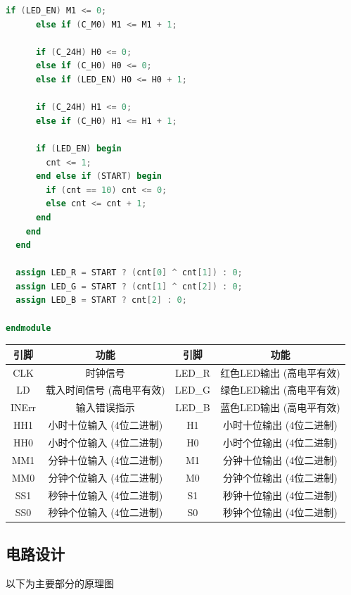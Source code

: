 \documentclass[12pt, a4paper]{ctexart}
\begin{document}
\begin{lstlisting}[language=Verilog, caption={数字时钟模块}]
      if (LED_EN) M1 <= 0;
      else if (C_M0) M1 <= M1 + 1;

      if (C_24H) H0 <= 0;
      else if (C_H0) H0 <= 0;
      else if (LED_EN) H0 <= H0 + 1;

      if (C_24H) H1 <= 0;
      else if (C_H0) H1 <= H1 + 1;

      if (LED_EN) begin
        cnt <= 1;
      end else if (START) begin
        if (cnt == 10) cnt <= 0;
        else cnt <= cnt + 1;
      end
    end
  end

  assign LED_R = START ? (cnt[0] ^ cnt[1]) : 0;
  assign LED_G = START ? (cnt[1] ^ cnt[2]) : 0;
  assign LED_B = START ? cnt[2] : 0;

endmodule
\end{lstlisting}

\begin{table}[H]
    \centering
    \begin{tabular}{|c|c|c|c|}
        \hline
        引脚 & 功能 & 引脚 & 功能 \\
        \hline
        CLK & 时钟信号               & LED\_R & 红色LED输出 (高电平有效) \\
        LD  & 载入时间信号 (高电平有效) & LED\_G & 绿色LED输出 (高电平有效) \\
        INErr & 输入错误指示          & LED\_B & 蓝色LED输出 (高电平有效) \\
        \hline
        HH1 & 小时十位输入 (4位二进制) & H1  & 小时十位输出 (4位二进制) \\
        HH0 & 小时个位输入 (4位二进制) & H0  & 小时个位输出 (4位二进制) \\
        MM1 & 分钟十位输入 (4位二进制) & M1  & 分钟十位输出 (4位二进制) \\
        MM0 & 分钟个位输入 (4位二进制) & M0  & 分钟个位输出 (4位二进制) \\
        SS1 & 秒钟十位输入 (4位二进制) & S1  & 秒钟十位输出 (4位二进制) \\
        SS0 & 秒钟个位输入 (4位二进制) & S0  & 秒钟个位输出 (4位二进制) \\
        \hline
    \end{tabular}
\end{table}

\subsection{电路设计}

以下为主要部分的原理图
\end{document}
